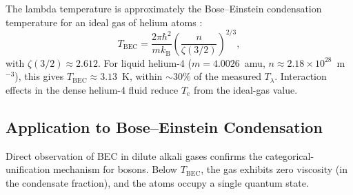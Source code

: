 \documentclass[twocolumn,10pt,a4paper]{article}
\theoremstyle{definition}
\theoremstyle{remark}
\newcommand{\kB}{k_{\mathrm{B}}}
\newcommand{\Tcrit}{T_{\mathrm{c}}}
\begin{document}
The lambda temperature is approximately the Bose--Einstein condensation temperature for an ideal gas of helium atoms \citep{bose1924,einstein1924}:
\begin{equation}
T_{\mathrm{BEC}} = \frac{2\pi\hbar^2}{m \kB}\left(\frac{n}{\zeta(3/2)}\right)^{2/3},
\label{eq:bec_tc}
\end{equation}
with $\zeta(3/2) \approx 2.612$. For liquid helium-4 ($m = 4.0026$~amu, $n \approx 2.18\times10^{28}$~m$^{-3}$), this gives $T_{\mathrm{BEC}} \approx 3.13$~K, within $\sim 30\%$ of the measured $T_\lambda$. Interaction effects in the dense helium-4 fluid reduce $\Tcrit$ from the ideal-gas value.

\subsection{Application to Bose--Einstein Condensation}

Direct observation of BEC in dilute alkali gases \citep{anderson1995,davis1995} confirms the categorical-unification mechanism for bosons. Below $T_{\mathrm{BEC}}$, the gas exhibits zero viscosity (in the condensate fraction), and the atoms occupy a single quantum state.
\end{document}
